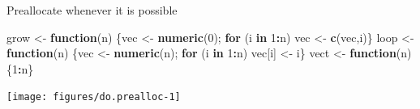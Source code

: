 \documentclass[10pt,ignorenonframetext,]{beamer}
\newenvironment{Shaded}{\begin{snugshade}}{\end{snugshade}}
\newcommand{\KeywordTok}[1]{\textcolor[rgb]{0.13,0.29,0.53}{\textbf{#1}}}
\newcommand{\DecValTok}[1]{\textcolor[rgb]{0.00,0.00,0.81}{#1}}
\newcommand{\StringTok}[1]{\textcolor[rgb]{0.31,0.60,0.02}{#1}}
\newcommand{\ControlFlowTok}[1]{\textcolor[rgb]{0.13,0.29,0.53}{\textbf{#1}}}
\newcommand{\OperatorTok}[1]{\textcolor[rgb]{0.81,0.36,0.00}{\textbf{#1}}}
\newcommand{\NormalTok}[1]{#1}
\begin{document}
\begin{frame}[fragile]{Preallocate whenever it is possible}

\scriptsize

\begin{Shaded}
\begin{Highlighting}[]
\NormalTok{grow <-}\StringTok{ }\ControlFlowTok{function}\NormalTok{(n) \{vec <-}\StringTok{ }\KeywordTok{numeric}\NormalTok{(}\DecValTok{0}\NormalTok{); }\ControlFlowTok{for}\NormalTok{ (i }\ControlFlowTok{in} \DecValTok{1}\OperatorTok{:}\NormalTok{n) vec <-}\StringTok{ }\KeywordTok{c}\NormalTok{(vec,i)\}}
\NormalTok{loop <-}\StringTok{ }\ControlFlowTok{function}\NormalTok{(n) \{vec <-}\StringTok{ }\KeywordTok{numeric}\NormalTok{(n); }\ControlFlowTok{for}\NormalTok{ (i }\ControlFlowTok{in} \DecValTok{1}\OperatorTok{:}\NormalTok{n) vec[i] <-}\StringTok{ }\NormalTok{i\}}
\NormalTok{vect <-}\StringTok{ }\ControlFlowTok{function}\NormalTok{(n) \{}\DecValTok{1}\OperatorTok{:}\NormalTok{n\}}
\end{Highlighting}
\end{Shaded}

\normalsize

\scriptsize

\begin{center}\texttt{[image: figures/do.prealloc-1]} \end{center}

\normalsize

\end{frame}
\end{document}
